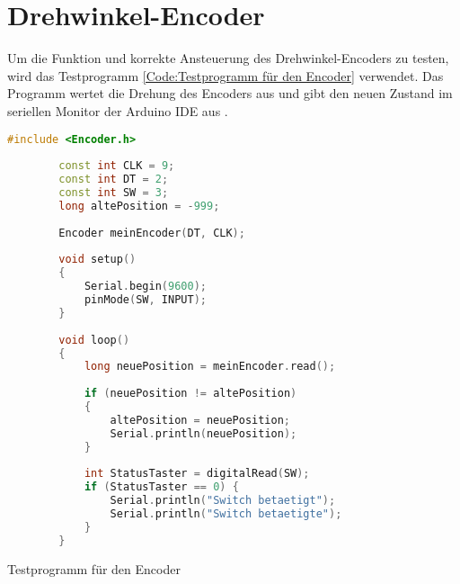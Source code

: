 \section{Drehwinkel-Encoder}

Um die Funktion und korrekte Ansteuerung des Drehwinkel-Encoders zu testen, wird das Testprogramm \ref{Code:Testprogramm für den Encoder} verwendet. Das Programm wertet die Drehung des Encoders aus und gibt den neuen Zustand im seriellen Monitor der Arduino IDE aus \cite{Stoffregen:2024}.

\begin{code}[H]
    \begin{lstlisting}[language=c++]
        #include <Encoder.h>
        
        const int CLK = 9;
        const int DT = 2;
        const int SW = 3;
        long altePosition = -999;
        
        Encoder meinEncoder(DT, CLK);
        
        void setup()
        {
            Serial.begin(9600);
            pinMode(SW, INPUT);
        }
        
        void loop()
        {
            long neuePosition = meinEncoder.read();
            
            if (neuePosition != altePosition)
            {
                altePosition = neuePosition;
                Serial.println(neuePosition);
            }
            
            int StatusTaster = digitalRead(SW);
            if (StatusTaster == 0) {
                Serial.println("Switch betaetigt");
                Serial.println("Switch betaetigte");
            }
        }
    \end{lstlisting}      
    
    \caption[Testprogramm für den Encoder]{Testprogramm für den Encoder}\label{Code:Testprogramm für den Encoder}    
\end{code}

